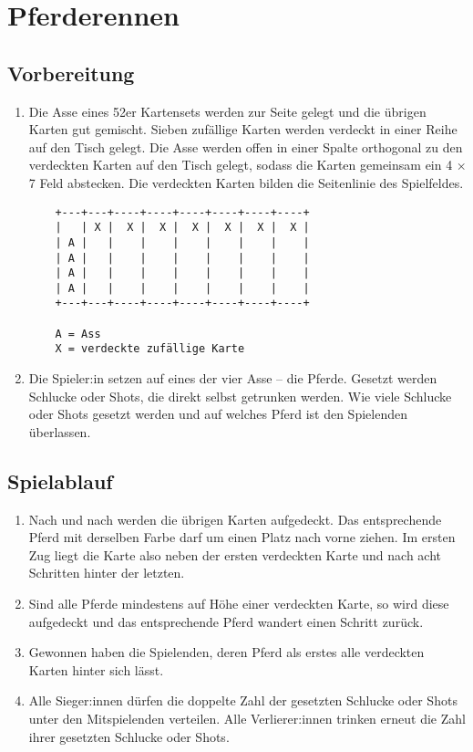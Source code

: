 \chapter{Pferderennen}
\section{Vorbereitung}
\begin{enumerate}[label={(\arabic*)}]    
    \item
    Die Asse eines 52er Kartensets werden zur Seite gelegt und die übrigen Karten gut gemischt.
    Sieben zufällige Karten werden verdeckt in einer Reihe auf den Tisch gelegt.
    Die Asse werden offen in einer Spalte orthogonal zu den verdeckten Karten auf den Tisch gelegt, sodass die Karten gemeinsam ein 4 \begin{math}\times\end{math} 7 Feld abstecken.
    Die verdeckten Karten bilden die Seitenlinie des Spielfeldes.
    \begin{verbatim}
    +---+---+----+----+----+----+----+----+
    |   | X |  X |  X |  X |  X |  X |  X |
    | A |   |    |    |    |    |    |    |
    | A |   |    |    |    |    |    |    |
    | A |   |    |    |    |    |    |    |
    | A |   |    |    |    |    |    |    |
    +---+---+----+----+----+----+----+----+
    
    A = Ass
    X = verdeckte zufällige Karte
    \end{verbatim}

    \item
    Die Spieler:in setzen auf eines der vier Asse – die \glqq{}Pferde\grqq{}.
    Gesetzt werden Schlucke oder Shots, die direkt selbst getrunken werden.
    Wie viele Schlucke oder Shots gesetzt werden und auf welches Pferd ist den Spielenden überlassen.
\end{enumerate}

\section{Spielablauf}
\begin{enumerate}[label={(\arabic*)}]
    \item
    Nach und nach werden die übrigen Karten aufgedeckt.
    Das entsprechende Pferd mit derselben Farbe darf um einen Platz nach vorne ziehen.
    Im ersten Zug liegt die Karte also neben der ersten verdeckten Karte und nach acht Schritten hinter der letzten.

    \item
    Sind alle Pferde mindestens auf Höhe einer verdeckten Karte, so wird diese aufgedeckt und das entsprechende Pferd wandert einen Schritt zurück.

    \item
    Gewonnen haben die Spielenden, deren Pferd als erstes alle verdeckten Karten hinter sich lässt.

    \item
    Alle Sieger:innen dürfen die doppelte Zahl der gesetzten Schlucke oder Shots unter den Mitspielenden verteilen.
    Alle Verlierer:innen trinken erneut die Zahl ihrer gesetzten Schlucke oder Shots.
\end{enumerate}
